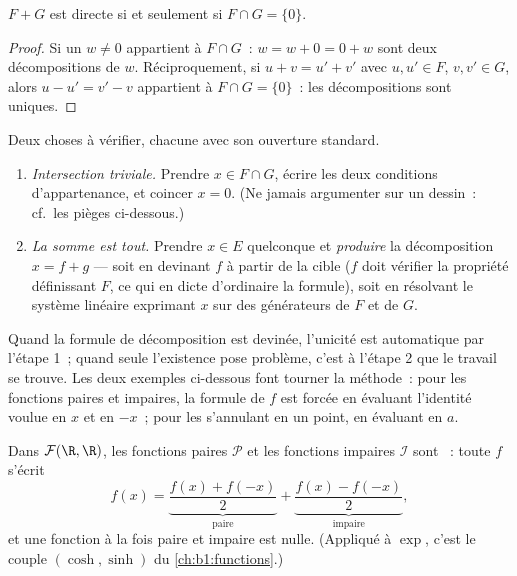 \begin{proposition}\label{prop:b1:vspaces:directsum}
$F + G$ est directe si et seulement si $F \cap G = \{0\}$.
\end{proposition}

\begin{proof}
Si un $w \neq 0$ appartient à $F \cap G$~: $w = w + 0 = 0 + w$ sont
deux décompositions de $w$. Réciproquement, si $u + v = u' + v'$ avec
$u, u' \in F$, $v, v' \in G$, alors $u - u' = v' - v$ appartient à
$F \cap G = \{0\}$~: les décompositions sont uniques.
\end{proof}

\begin{method}[Démontrer que $E = F \oplus G$]
\label{met:b1:vspaces:directsum}
Deux choses à vérifier, chacune avec son ouverture standard.
\begin{enumerate}
  \item \emph{Intersection triviale.} Prendre $x \in F \cap G$,
        écrire les deux conditions d'appartenance, et coincer $x =
        0$. (Ne jamais argumenter sur un dessin~: cf.\ les pièges
        ci-dessous.)
  \item \emph{La somme est tout.} Prendre $x \in E$ quelconque
        et \emph{produire} la décomposition $x = f + g$ ---
        soit en devinant $f$ à partir de la cible ($f$ doit vérifier
        la propriété définissant $F$, ce qui en dicte d'ordinaire la
        formule), soit en résolvant le système linéaire exprimant $x$
        sur des générateurs de $F$ et de $G$.
\end{enumerate}
Quand la formule de décomposition est devinée, l'unicité est
automatique par l'étape 1~; quand seule l'existence pose problème,
c'est à l'étape 2 que le travail se trouve. Les deux exemples
ci-dessous font tourner la méthode~: pour les fonctions paires et
impaires, la formule de $f$ est forcée en évaluant l'identité voulue
en $x$ et en $-x$~; pour les  s'annulant en un point, en
évaluant en $a$.
\end{method}

\begin{example}\label{ex:b1:vspaces:evenodd}
Dans $\mathcal{F}(\R, \R)$, les fonctions paires $\mathcal{P}$ et les
fonctions impaires $\mathcal{I}$ sont ~: toute $f$
s'écrit
\[
f(x) = \underbrace{\frac{f(x) + f(-x)}{2}}_{\text{paire}}
+ \underbrace{\frac{f(x) - f(-x)}{2}}_{\text{impaire}},
\]
et une fonction à la fois paire et impaire est nulle. (Appliqué à
$\exp$, c'est le couple $(\cosh, \sinh)$ du \cref{ch:b1:functions}.)
\end{example}

